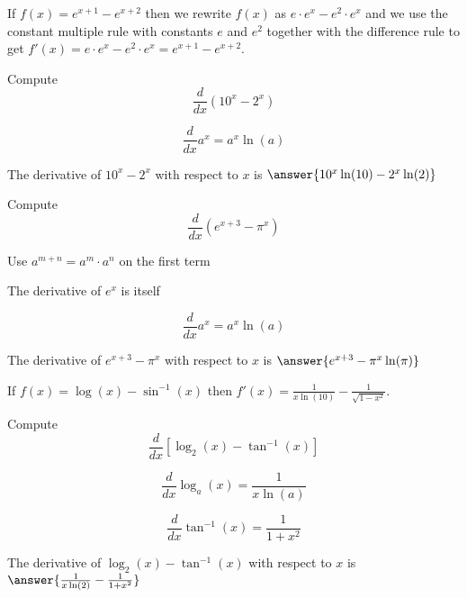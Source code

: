 \documentclass[handout]{ximera}
\begin{document}
\begin{example} %
 If $f(x) = e^{x+ 1} - e^{x+2}$ then we rewrite $f(x)$ as $ e\cdot e^x - e^2 \cdot e^x$ and 
we use the constant multiple rule with constants $e$ and $e^2$ together with the difference rule to get 
$f'(x) = e\cdot e^x - e^2 \cdot e^x = e^{x+1} - e^{x+2}$.
\end{example}


\begin{problem} %
  Compute 
  \[
  \frac{d}{dx} \left(10^x - 2^x\right)
  \]
  
    \begin{hint}
      \[
      \frac{d}{dx} a^x = a^x \ln(a)
      \]
    \end{hint}    
		The derivative of $10^x - 2^x$ with respect to $x$ is
		 $\answer{10^x \ln(10) - 2^x \ln(2)}$
	
\end{problem}

\begin{problem} %
  Compute 
  \[
  \frac{d}{dx} \left(e^{x + 3} - \pi^x\right)
  \]
  
  	\begin{hint}
		  Use $a^{m+n} = a^m \cdot a^n$ on the first term
		\end{hint}
		\begin{hint}
		  The derivative of $e^x$ is itself
		\end{hint}
		\begin{hint}
      \[
      \frac{d}{dx} a^x = a^x \ln(a)
      \]
    \end{hint}
		The derivative of $e^{x+3} - \pi^x$ with respect to $x$ is
		 $\answer{e^{x+3}  - \pi^x \ln(\pi)}$
	
\end{problem}



\begin{example} %
 If $f(x) = \log(x) - \sin^{-1}(x)$ then $f'(x) = \frac{1}{x\ln(10)} - \frac{1}{\sqrt{1-x^2}}$.
\end{example}


\begin{problem} %
  Compute 
  \[
  \frac{d}{dx} \left[\log_2(x) - \tan^{-1}(x)\right]
  \]
  
    \begin{hint}
      \[
      \frac{d}{dx} \log_a(x) = \frac{1}{x\ln(a)}
      \]
    \end{hint}
		\begin{hint}
		  \[
      \frac{d}{dx} \tan^{-1}(x) = \frac{1}{1+x^2}
      \]
		\end{hint}
		The derivative of $\log_2(x) - \tan^{-1}(x)$ with respect to $x$ is
		 $\answer{\frac{1}{x\ln(2)}  - \frac{1}{1+x^2}}$
	
\end{problem}
\end{document}
